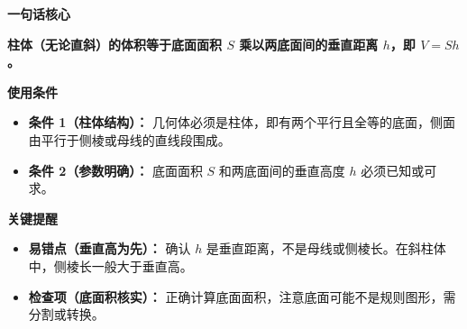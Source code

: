 \begin{summarybox}
	\textbf{\textcolor{CSummary}{一句话核心}}

	\textbf{柱体（无论直斜）的体积等于底面面积 $S$ 乘以两底面间的垂直距离 $h$，即 $V=Sh$。}

	\medskip
	\textbf{\textcolor{CSummary}{使用条件}}
	\begin{itemize}[leftmargin=*, itemsep=0.5em, topsep=0.4em]
		\item \textbf{条件 1（柱体结构）：} 几何体必须是柱体，即有两个平行且全等的底面，侧面由平行于侧棱或母线的直线段围成。
		\item \textbf{条件 2（参数明确）：} 底面面积 $S$ 和两底面间的垂直高度 $h$ 必须已知或可求。
	\end{itemize}

	\medskip
	\textbf{\textcolor{CSummary}{关键提醒}}
	\begin{itemize}[leftmargin=*, itemsep=0.5em, topsep=0.4em]
		\item \textbf{易错点（垂直高为先）：} 确认 $h$ 是垂直距离，不是母线或侧棱长。在斜柱体中，侧棱长一般大于垂直高。
		\item \textbf{检查项（底面积核实）：} 正确计算底面面积，注意底面可能不是规则图形，需分割或转换。
	\end{itemize}
\end{summarybox}
